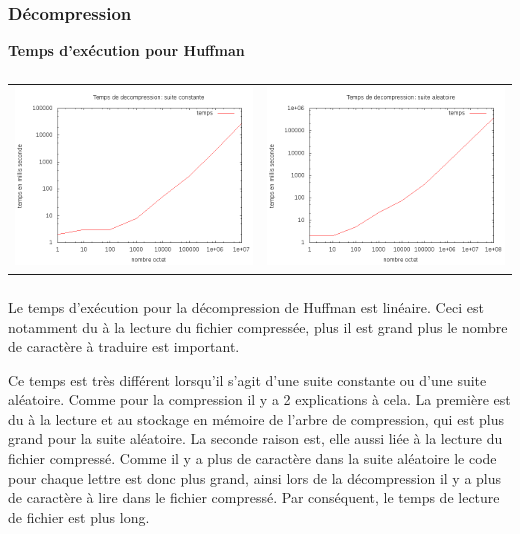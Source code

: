 \documentclass{report}
\begin{document}
\subsubsection*{Décompression}
\textbf{Temps d’exécution pour Huffman}
\subparagraph*{}
\hspace{-2cm}\begin{tabular}{l | l}
\includegraphics[width=7cm]{tempsDhC.png} & 
\includegraphics[width=7cm]{tempsDhA.png}
\end{tabular}
\subparagraph*{}
Le temps d'exécution pour la décompression de Huffman est linéaire. Ceci est notamment du à la lecture du fichier compressée, plus il est grand plus le nombre de caractère à traduire est important. 

Ce temps est très différent lorsqu’il s'agit d'une suite constante ou d'une suite aléatoire. Comme pour la compression il y a 2 explications à cela. La première est du à la lecture et au stockage en mémoire de l'arbre de compression, qui est plus grand pour la suite aléatoire. La seconde raison est, elle aussi liée à la lecture du fichier compressé. Comme il y a plus de caractère dans la suite aléatoire le code pour chaque lettre est donc plus grand, ainsi lors de la décompression il y a plus de caractère à lire dans le fichier compressé. Par conséquent, le temps de lecture de fichier est plus long.  
\end{document}
